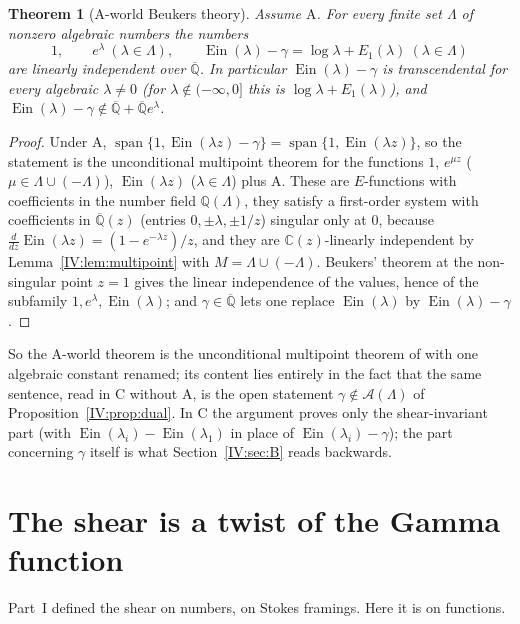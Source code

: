 \documentclass[11pt,a4paper]{article}
\newcommand{\Q}{\mathbb Q}
\newcommand{\C}{\mathbb C}
\newcommand{\Qbar}{\overline{\mathbb Q}}
\newcommand{\Ein}{\operatorname{Ein}}
\newcommand{\Aff}{\mathcal A}
\DeclareMathOperator{\spn}{span}
\newtheorem{theorem}{Theorem}[section]
\theoremstyle{definition}
\theoremstyle{remark}
\numberwithin{equation}{section}
\begin{document}
\begin{theorem}[$\mathrm A$-world Beukers theory]\label{IV:thm:Aworld}
Assume $\mathrm A$. For every finite set $\Lambda$ of nonzero algebraic numbers the numbers
\[
 1,\qquad e^{\lambda}\ (\lambda\in\Lambda),\qquad \Ein(\lambda)-\gamma=\log\lambda+E_1(\lambda)\ (\lambda\in\Lambda)
\]
are linearly independent over $\Qbar$. In particular $\Ein(\lambda)-\gamma$ is
transcendental for every algebraic $\lambda\ne0$ (for $\lambda\notin(-\infty,0]$ this is
$\log\lambda+E_1(\lambda)$), and $\Ein(\lambda)-\gamma\notin\Qbar+\Qbar e^\lambda$.
\end{theorem}
\begin{proof}
Under $\mathrm A$, $\spn\{1,\Ein(\lambda z)-\gamma\}=\spn\{1,\Ein(\lambda z)\}$, so the
statement is the unconditional multipoint theorem for the functions $1$, $e^{\mu z}$
($\mu\in\Lambda\cup(-\Lambda)$), $\Ein(\lambda z)$ ($\lambda\in\Lambda$) plus $\mathrm A$.
These are $E$-functions with coefficients in the number field $\Q(\Lambda)$, they satisfy a
first-order system with coefficients in $\Qbar(z)$ (entries $0,\pm\lambda,\pm1/z$) singular
only at $0$, because $\frac{d}{dz}\Ein(\lambda z)=(1-e^{-\lambda z})/z$, and they are
$\C(z)$-linearly independent by Lemma~\ref{IV:lem:multipoint} with $M=\Lambda\cup(-\Lambda)$.
Beukers' theorem \cite[Cor.~1.4]{Beukers} at the non-singular point $z=1$ gives the
linear independence of the values, hence of the subfamily $1,e^\lambda,\Ein(\lambda)$; and
$\gamma\in\Qbar$ lets one replace $\Ein(\lambda)$ by $\Ein(\lambda)-\gamma$.
\end{proof}

So the $\mathrm A$-world theorem is the unconditional multipoint theorem of \cite{M}
with one algebraic constant renamed; its content lies entirely in the fact that the same
sentence, read in $\mathrm C$ without $\mathrm A$, is the open statement
$\gamma\notin\Aff(\Lambda)$ of Proposition~\ref{IV:prop:dual}. In $\mathrm C$ the argument
proves only the shear-invariant part (with $\Ein(\lambda_i)-\Ein(\lambda_1)$ in place of
$\Ein(\lambda_i)-\gamma$); the part concerning $\gamma$ itself is what
Section~\ref{IV:sec:B} reads backwards.

\section{The shear is a twist of the Gamma function}\label{IV:sec:twist}

Part~I defined the shear on numbers, \cite{K002} on Stokes framings. Here it is on
functions.
\end{document}
